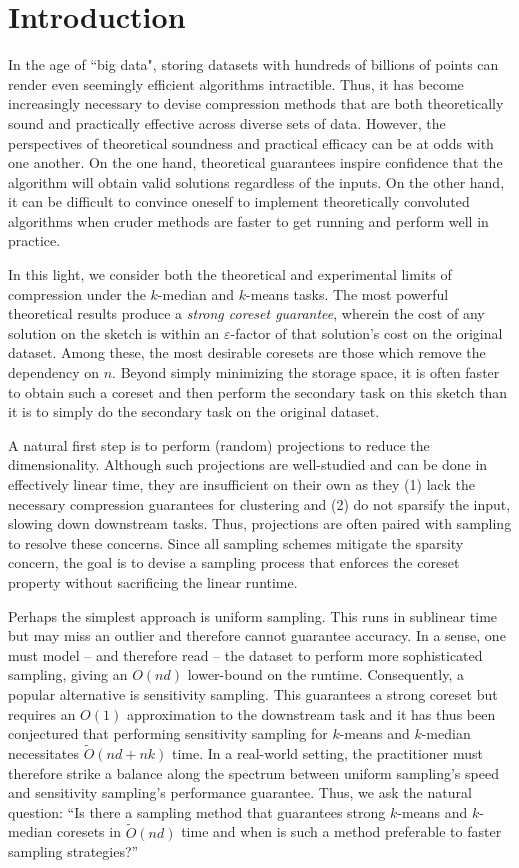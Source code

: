 \section{Introduction}

In the age of ``big data", storing datasets with hundreds of billions of points can render even seemingly efficient algorithms intractible. Thus, it has become
increasingly necessary to devise compression methods that are both theoretically sound and practically effective across diverse sets of data.
However, the perspectives of theoretical soundness and practical efficacy can be at odds with one another. On the one hand, theoretical
guarantees inspire confidence that the algorithm will obtain valid solutions regardless of the inputs. On the other hand, it can be difficult to convince
oneself to implement theoretically convoluted algorithms when cruder methods are faster to get running and perform well in practice.

In this light, we consider both the theoretical and experimental limits of compression under the $k$-median and $k$-means tasks.
The most powerful theoretical results produce a \emph{strong coreset guarantee}, wherein the cost of any solution on the sketch is within an
$\varepsilon$-factor of that solution's cost on the original dataset. Among these, the most desirable coresets are those which remove the dependency on $n$.
Beyond simply minimizing the storage space, it is often faster to obtain such a coreset and then perform the secondary task on this sketch
than it is to simply do the secondary task on the original dataset.

A natural first step is to perform (random) projections to reduce the dimensionality. Although such projections are well-studied and can be done
in effectively linear time, they are insufficient on their own as they (1) lack the necessary compression guarantees for clustering and (2) do not
sparsify the input, slowing down downstream tasks. Thus, projections are often paired with sampling to resolve these concerns. Since all sampling schemes
mitigate the sparsity concern, the goal is to devise a sampling process that enforces the coreset property without sacrificing the linear runtime.

Perhaps the simplest approach is uniform sampling. This runs in sublinear time but may miss an outlier and therefore cannot guarantee accuracy.
In a sense, one must model -- and therefore read -- the dataset to perform more sophisticated sampling, giving an $O(nd)$ lower-bound on
the runtime. Consequently, a popular alternative is sensitivity sampling. This guarantees a strong coreset but requires an $O(1)$ approximation to the
downstream task and it has thus been conjectured that performing sensitivity sampling for $k$-means and $k$-median necessitates $\tilde{O}(nd + nk)$ time.
In a real-world setting, the practitioner must therefore strike a balance along the spectrum between uniform sampling's speed and sensitivity sampling's
performance guarantee. Thus, we ask the natural question: ``Is there a sampling method that guarantees strong $k$-means
and $k$-median coresets in $\tilde{O}(nd)$ time and when is such a method preferable to faster sampling strategies?''

